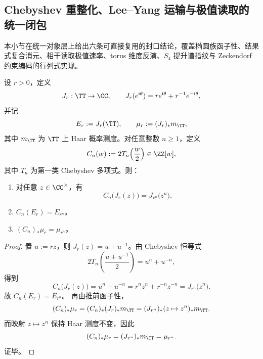 \subsection{Chebyshev 重整化、Lee--Yang 运输与极值读取的统一闭包}\label{subsec:conclusion-chebyshev-lee-yang-extreme-closure}
本小节在统一对象层上给出六条可直接复用的封口结论，覆盖椭圆族函子性、结果式复合消元、相干读取极值速率、torus 维度反演、\(S_4\) 提升谱指纹与 Zeckendorf 约束编码的行列式实现。

\begin{conclusion}\label{con:conclusion-joukowsky-chebyshev-functorial}
设 \(r>0\)，定义
\[
J_r:\TT\to\CC,\qquad J_r(e^{\mathrm{i}\theta})=r e^{\mathrm{i}\theta}+r^{-1}e^{-\mathrm{i}\theta},
\]
并记
\[
E_r:=J_r(\TT),\qquad \mu_r:=(J_r)_*m_{\TT},
\]
其中 \(m_{\TT}\) 为 \(\TT\) 上 Haar 概率测度。对任意整数 \(n\ge 1\)，定义
\[
C_n(w):=2T_n\!\left(\frac{w}{2}\right)\in\ZZ[w],
\]
其中 \(T_n\) 为第一类 Chebyshev 多项式。则：
\begin{enumerate}
  \item 对任意 \(z\in\CC^\times\)，有
  \[
  C_n\!\bigl(J_r(z)\bigr)=J_{r^n}\!\bigl(z^n\bigr).
  \]
  \item \(C_n(E_r)=E_{r^n}\)。
  \item \((C_n)_*\mu_r=\mu_{r^n}\)。
\end{enumerate}
\end{conclusion}
\begin{proof}
置 \(u:=rz\)，则 \(J_r(z)=u+u^{-1}\)。由 Chebyshev 恒等式
\[
2T_n\!\left(\frac{u+u^{-1}}{2}\right)=u^n+u^{-n},
\]
得到
\[
C_n\!\bigl(J_r(z)\bigr)=u^n+u^{-n}=r^n z^n+r^{-n}z^{-n}=J_{r^n}\!\bigl(z^n\bigr).
\]
故 \(C_n(E_r)=E_{r^n}\)。
再由推前函子性，
\[
(C_n)_*\mu_r
=(C_n)_*(J_r)_*m_{\TT}
=(J_{r^n})_*(z\mapsto z^n)_*m_{\TT}.
\]
而映射 \(z\mapsto z^n\) 保持 Haar 测度不变，因此
\[
(C_n)_*\mu_r=(J_{r^n})_*m_{\TT}=\mu_{r^n}.
\]
证毕。
\end{proof}

